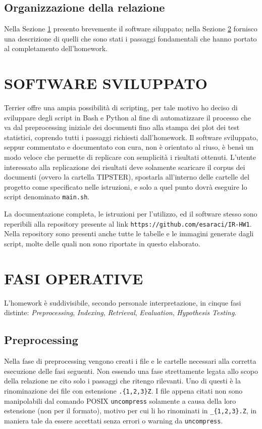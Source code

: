 \documentclass[letterpaper, 10 pt, conference]{ieeeconf}  %
\begin{document}
\subsection{Organizzazione della relazione}
Nella Sezione \ref{sec:sw} presento brevemente il software siluppato; nella Sezione \ref{sec:devops} fornisco una descrizione di quelli che sono stati i passaggi fondamentali che hanno portato al completamento dell'homework.

\section{SOFTWARE SVILUPPATO}\label{sec:sw}

Terrier offre una ampia possibilità di scripting, per tale motivo ho deciso di sviluppare degli script in Bash e Python al fine di automatizzare il processo che va dal preprocessing iniziale dei documenti fino alla stampa dei plot dei test statistici, coprendo tutti i passaggi richiesti dall'homework.
Il software sviluppato, seppur commentato e documentato con cura, non è orientato al riuso, è bensì un modo veloce che permette di replicare con semplicità i risultati ottenuti.
L'utente interessato alla replicazione dei risultati deve solamente scaricare il corpus dei documenti (ovvero la cartella TIPSTER), spostarla all'interno delle cartelle del progetto come specificato nelle istruzioni, e solo a quel punto dovrà eseguire lo script denominato \texttt{main.sh}.

La documentazione completa, le istruzioni per l'utilizzo, ed il software stesso sono reperibili alla repository presente al link \texttt{https://github.com/esaraci/IR-HW1}. Nella repository sono presenti anche tutte le tabelle e le immagini generate dagli script, molte delle quali non sono riportate in questo elaborato.

\section{FASI OPERATIVE}\label{sec:devops}
L'homework è suddivisibile, secondo personale interpretazione, in cinque fasi distinte: \textit{Preprocessing}, \textit{Indexing}, \textit{Retrieval}, \textit{Evaluation}, \textit{Hypothesis Testing}.
\subsection{Preprocessing}
Nella fase di preprocessing vengono creati i file e le cartelle necessari alla corretta esecuzione delle fasi seguenti. Non essendo una fase strettamente legata allo scopo della relazione ne cito solo i passaggi che ritengo rilevanti. Uno di questi è la rinominazione dei file con estensione \texttt{.\{1,2,3\}Z}. I file appena citati non sono manipolabili dal comando POSIX \texttt{uncompress} solamente a causa della loro estensione (non per il formato), motivo per cui li ho rinominati in \texttt{\_\{1,2,3\}.Z}, in maniera tale da essere accettati senza errori o warning da \texttt{uncompress}.
\end{document}
